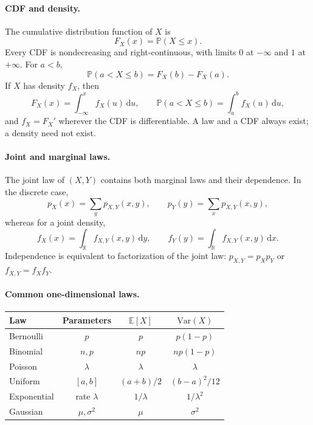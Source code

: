 \documentclass[11pt]{article}
\newcommand{\R}{\mathbb{R}}
\newcommand{\Pbb}{\mathbb{P}}
\newcommand{\E}{\mathbb{E}}
\newcommand{\Var}{\mathrm{Var}}
\newcommand{\dd}{\,\mathrm{d}}
\newcommand{\1}{\mathbf{1}}
\theoremstyle{plain}
\theoremstyle{definition}
\theoremstyle{remark}
\begin{document}
\paragraph{CDF and density.}
The cumulative distribution function of $X$ is
\[
F_X(x)=\Pbb(X\le x).
\]
Every CDF is nondecreasing and right-continuous, with limits $0$ at
$-\infty$ and $1$ at $+\infty$. For $a<b$,
\[
\Pbb(a<X\le b)=F_X(b)-F_X(a).
\]
If $X$ has density $f_X$, then
\[
F_X(x)=\int_{-\infty}^x f_X(u)\dd u,
\qquad
\Pbb(a<X\le b)=\int_a^b f_X(u)\dd u,
\]
and $f_X=F_X'$ wherever the CDF is differentiable. A law and a CDF always
exist; a density need not exist.

\paragraph{Joint and marginal laws.}
The joint law of $(X,Y)$ contains both marginal laws and their dependence.
In the discrete case,
\[
p_X(x)=\sum_y p_{X,Y}(x,y),
\qquad
p_Y(y)=\sum_x p_{X,Y}(x,y),
\]
whereas for a joint density,
\[
f_X(x)=\int_{\R}f_{X,Y}(x,y)\dd y,
\qquad
f_Y(y)=\int_{\R}f_{X,Y}(x,y)\dd x.
\]
Independence is equivalent to factorization of the joint law:
$p_{X,Y}=p_Xp_Y$ or $f_{X,Y}=f_Xf_Y$.

\paragraph{Common one-dimensional laws.}
\begin{center}
\renewcommand{\arraystretch}{1.15}
\begin{tabular}{@{}lccc@{}}
\toprule
Law & Parameters & $\E[X]$ & $\Var(X)$\\
\midrule
Bernoulli & $p$ & $p$ & $p(1-p)$\\
Binomial & $n,p$ & $np$ & $np(1-p)$\\
Poisson & $\lambda$ & $\lambda$ & $\lambda$\\
Uniform & $[a,b]$ & $(a+b)/2$ & $(b-a)^2/12$\\
Exponential & rate $\lambda$ & $1/\lambda$ & $1/\lambda^2$\\
Gaussian & $\mu,\sigma^2$ & $\mu$ & $\sigma^2$\\
\bottomrule
\end{tabular}
\end{center}
\end{document}

